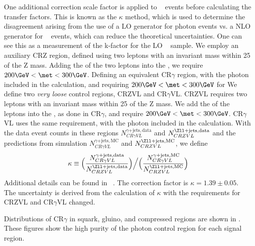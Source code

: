 One additional correction scale factor is applied to \gammajets~ events before calculating the transfer factors.
This is known as the $\kappa$ method, which is used to determine the disagreement arising from the use of a LO generator for photon events vs. a NLO generator for \zjets~ events, which can reduce the theoretical uncertainties.
One can see this as a measurement of the k-factor for the LO \gammajets~ sample.
We employ an auxiliary CRZ region, defined using two leptons with an invariant mass within 25 \GeV of the Z mass.
Adding the \pt of the two leptons into the \met, we require $200 \GeV < \met < 300 \GeV$.
Defining an equivalent CR$\gamma$ region, with the photon \pt included in the \met calculation, and requiring $200 \GeV < \met < 300 \GeV$ for
We define two \textit{very loose} control regions, CRZVL and CR$\gamma$VL.
CRZVL requires two leptons with an invariant mass within 25 \GeV of the Z mass.
We add the \pt of the leptons into the \met, as done in CR$\gamma$, and require $200 \GeV < \met < 300 \GeV$.
CR$\gamma$VL uses the same \met requirement, with the photon included in the \met calculation.
With the data event counts in these regions $N_{CR\gamma VL}^{\gamma\mathrm{+jets,data}}$ and $N_{CRZVL}^{\Zll\mathrm{+jets,data}}$ and the predictions from simulation $N_{CR\gamma VL}^{\gamma\mathrm{+jets,MC}}$ and $N_{CRZVL}^{\Zll\mathrm{+jets,MC}}$, we define
\begin{align}
\kappa \equiv \Big( \frac{N_{CR\gamma VL}^{\gamma\mathrm{+jets,data}}}{N_{CRZVL}^{\Zll\mathrm{+jets,data}}} \Big) \Big/ \Big( \frac{N_{CR\gamma VL}^{\gamma\mathrm{+jets,MC}}}{N_{CRZVL}^{\Zll\mathrm{+jets,MC}}} \Big)
\end{align}
Additional details can be found in ~\cite{0-leptonPaper,0LPaper_13TeV,ATLAS-CONF-2016-078}.
The correction factor is $\kappa = 1.39 \pm 0.05$.
The uncertainty is derived from the calculation of $\kappa$ with the \met requirements for CRZVL and CR$\gamma$VL changed.

Distributions of CR$\gamma$ in squark, gluino, and compressed regions are shown in .
These figures show the high purity of the photon control region for each signal region.

